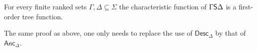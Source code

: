 \begin{lemma}\label{lem:sincemod}
    For every finite ranked sets $\Gamma, \Delta \subseteq \Sigma$  the characteristic function of $\Gamma \mathsf S \Delta$ is a first-order tree function.
\end{lemma}
\begin{pr}
The same proof as above, one only needs to replace the use of $\mathsf{Desc}_\Delta$ by that of $\mathsf{Anc}_\Delta$.
\end{pr}

         
